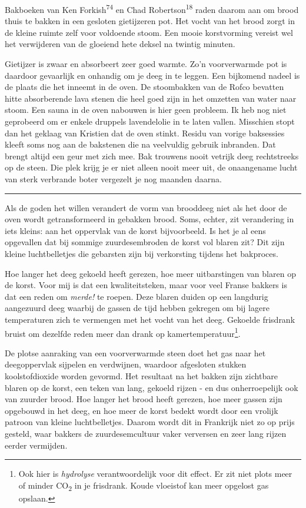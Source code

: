 \documentclass[
  11pt,
  dutch,
]{memoir}
\begin{document}
Bakboeken van Ken Forkish\textsuperscript{74} en Chad
Robertson\textsuperscript{18} raden daarom aan om brood thuis te bakken
in een gesloten gietijzeren pot. Het vocht van het brood zorgt in de
kleine ruimte zelf voor voldoende stoom. Een mooie korstvorming vereist
wel het verwijderen van de gloeiend hete deksel na twintig minuten.

Gietijzer is zwaar en absorbeert zeer goed warmte. Zo'n voorverwarmde
pot is daardoor gevaarlijk en onhandig om je deeg in te leggen. Een
bijkomend nadeel is de plaats die het inneemt in de oven. De stoombakken
van de Rofco bevatten hitte absorberende lava stenen die heel goed zijn
in het omzetten van water naar stoom. Een sauna in de oven nabouwen is
hier geen probleem. Ik heb nog niet geprobeerd om er enkele druppels
lavendelolie in te laten vallen. Misschien stopt dan het geklaag van
Kristien dat de oven stinkt. Residu van vorige baksessies kleeft soms
nog aan de bakstenen die na veelvuldig gebruik inbranden. Dat brengt
altijd een geur met zich mee. Bak trouwens nooit vetrijk deeg
rechtstreeks op de steen. Die plek krijg je er niet alleen nooit meer
uit, de onaangename lucht van sterk verbrande boter vergezelt je nog
maanden daarna.

\pfbreak

Als de goden het willen verandert de vorm van brooddeeg niet als het
door de oven wordt getransformeerd in gebakken brood. Soms, echter, zit
verandering in iets kleins: aan het oppervlak van de korst bijvoorbeeld.
Is het je al eens opgevallen dat bij sommige zuurdesembroden de korst
vol blaren zit? Dit zijn kleine luchtbelletjes die gebarsten zijn bij
verkorsting tijdens het bakproces.

Hoe langer het deeg gekoeld heeft gerezen, hoe meer uitbarstingen van
blaren op de korst. Voor mij is dat een kwaliteitsteken, maar voor veel
Franse bakkers is dat een reden om \emph{merde!} te roepen. Deze blaren
duiden op een langdurig aangezuurd deeg waarbij de gassen de tijd hebben
gekregen om bij lagere temperaturen zich te vermengen met het vocht van
het deeg. Gekoelde frisdrank bruist om dezelfde reden meer dan drank op
kamertemperatuur\footnote{Ook hier is \emph{hydrolyse} verantwoordelijk
  voor dit effect. Er zit niet plots meer of minder CO\textsubscript{2}
  in je frisdrank. Koude vloeistof kan meer opgelost gas opslaan.}.

De plotse aanraking van een voorverwarmde steen doet het gas naar het
deegoppervlak sijpelen en verdwijnen, waardoor afgesloten stukken
koolstofdioxide worden gevormd. Het resultaat na het bakken zijn
zichtbare blaren op de korst, een teken van lang, gekoeld rijzen - en
dus onherroepelijk ook van zuurder brood. Hoe langer het brood heeft
gerezen, hoe meer gassen zijn opgebouwd in het deeg, en hoe meer de
korst bedekt wordt door een vrolijk patroon van kleine luchtbelletjes.
Daarom wordt dit in Frankrijk niet zo op prijs gesteld, waar bakkers de
zuurdesemcultuur vaker verversen en zeer lang rijzen eerder vermijden.
\end{document}
